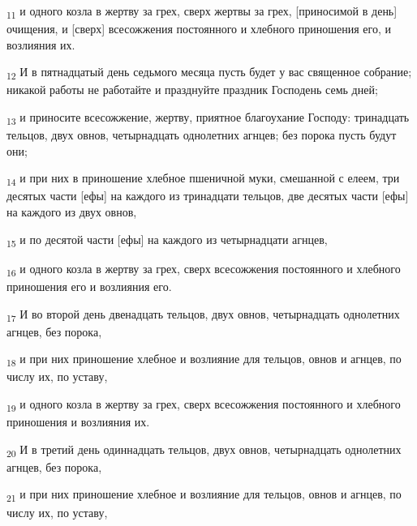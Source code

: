 \begin{tcolorbox}
\textsubscript{11} и одного козла в жертву за грех, сверх жертвы за грех, [приносимой в день] очищения, и [сверх] всесожжения постоянного и хлебного приношения его, и возлияния их.
\end{tcolorbox}
\begin{tcolorbox}
\textsubscript{12} И в пятнадцатый день седьмого месяца пусть будет у вас священное собрание; никакой работы не работайте и празднуйте праздник Господень семь дней;
\end{tcolorbox}
\begin{tcolorbox}
\textsubscript{13} и приносите всесожжение, жертву, приятное благоухание Господу: тринадцать тельцов, двух овнов, четырнадцать однолетних агнцев; без порока пусть будут они;
\end{tcolorbox}
\begin{tcolorbox}
\textsubscript{14} и при них в приношение хлебное пшеничной муки, смешанной с елеем, три десятых части [ефы] на каждого из тринадцати тельцов, две десятых части [ефы] на каждого из двух овнов,
\end{tcolorbox}
\begin{tcolorbox}
\textsubscript{15} и по десятой части [ефы] на каждого из четырнадцати агнцев,
\end{tcolorbox}
\begin{tcolorbox}
\textsubscript{16} и одного козла в жертву за грех, сверх всесожжения постоянного и хлебного приношения его и возлияния его.
\end{tcolorbox}
\begin{tcolorbox}
\textsubscript{17} И во второй день двенадцать тельцов, двух овнов, четырнадцать однолетних агнцев, без порока,
\end{tcolorbox}
\begin{tcolorbox}
\textsubscript{18} и при них приношение хлебное и возлияние для тельцов, овнов и агнцев, по числу их, по уставу,
\end{tcolorbox}
\begin{tcolorbox}
\textsubscript{19} и одного козла в жертву за грех, сверх всесожжения постоянного и хлебного приношения и возлияния их.
\end{tcolorbox}
\begin{tcolorbox}
\textsubscript{20} И в третий день одиннадцать тельцов, двух овнов, четырнадцать однолетних агнцев, без порока,
\end{tcolorbox}
\begin{tcolorbox}
\textsubscript{21} и при них приношение хлебное и возлияние для тельцов, овнов и агнцев, по числу их, по уставу,
\end{tcolorbox}
